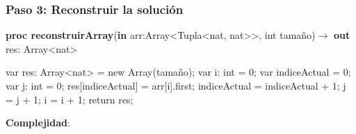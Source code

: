 \documentclass{article}
\newcommand{\Complexity}[1]{\textbf{Complejidad}: #1}
\begin{document}
\subsubsection*{Paso 3: Reconstruir la solución}
\begin{algorithm}[H]
    \caption{
        \textbf{proc reconstruirArray}(\textbf{in} arr:\textnormal{Array\textless{}Tupla\textless{}nat, nat\textgreater{}\textgreater{}}, int tamaño)$\to$ \textbf{out} res: \textnormal{Array\textless{}nat\textgreater{}}
    }
    \begin{algorithmic}[1]
        \State var res: Array\textless{}nat\textgreater{} = new Array(tamaño); 
        \State var i: int = 0;
        \State var indiceActual = 0;
            \State var j: int = 0;
                \State res[indiceActual] = arr[i].first;
                \State indiceActual = indiceActual + 1;
                \State j = j + 1;
            \EndWhile{}
            \State i = i + 1;
        \EndWhile
        \State return res;
    \end{algorithmic}
    \Complexity{}
\end{algorithm}
\end{document}
